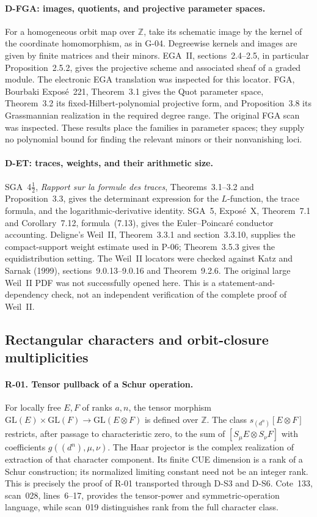 \documentclass[11pt,a4paper]{article}
\theoremstyle{definition}\newtheorem{definition}{Definition}
\begin{document}
\paragraph{D-FGA: images, quotients, and projective parameter spaces.}
For a homogeneous orbit map over $\mathbb Z$, take its schematic image by the kernel of the coordinate homomorphism, as in G-04. Degreewise kernels and images are given by finite matrices and their minors. EGA~II, sections~2.4--2.5, in particular Proposition~2.5.2, gives the projective scheme and associated sheaf of a graded module. The electronic EGA translation was inspected for this locator. FGA, Bourbaki Expos\'e~221, Theorem~3.1 gives the Quot parameter space, Theorem~3.2 its fixed-Hilbert-polynomial projective form, and Proposition~3.8 its Grassmannian realization in the required degree range. The original FGA scan was inspected. These results place the families in parameter spaces; they supply no polynomial bound for finding the relevant minors or their nonvanishing loci.

\paragraph{D-ET: traces, weights, and their arithmetic size.}
SGA~4$\frac12$, \emph{Rapport sur la formule des traces}, Theorems~3.1--3.2 and Proposition~3.3, gives the determinant expression for the $L$-function, the trace formula, and the logarithmic-derivative identity. SGA~5, Expos\'e~X, Theorem~7.1 and Corollary~7.12, formula~(7.13), gives the Euler--Poincar\'e conductor accounting. Deligne's Weil~II, Theorem~3.3.1 and section~3.3.10, supplies the compact-support weight estimate used in P-06; Theorem~3.5.3 gives the equidistribution setting. The Weil~II locators were checked against Katz and Sarnak (1999), sections~9.0.13--9.0.16 and Theorem~9.2.6. The original large Weil~II PDF was not successfully opened here. This is a statement-and-dependency check, not an independent verification of the complete proof of Weil~II.

\subsection{Rectangular characters and orbit-closure multiplicities}

\paragraph{R-01. Tensor pullback of a Schur operation.}
For locally free $E,F$ of ranks $a,n$, the tensor morphism $\mathrm{GL}(E)\times\mathrm{GL}(F)\to\mathrm{GL}(E\otimes F)$ is defined over $\mathbb Z$. The class $s_{(d^n)}[E\otimes F]$ restricts, after passage to characteristic zero, to the sum of $[S_\mu E\otimes S_\nu F]$ with coefficients $g((d^n),\mu,\nu)$. The Haar projector is the complex realization of extraction of that character component. Its finite CUE dimension is a rank of a Schur construction; its normalized limiting constant need not be an integer rank. This is precisely the proof of R-01 transported through D-S3 and D-S6. Cote~133, scan~028, lines~6--17, provides the tensor-power and symmetric-operation language, while scan~019 distinguishes rank from the full character class.
\end{document}
